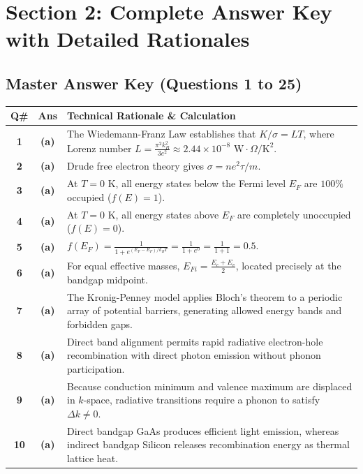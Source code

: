 \newpage
\section{Section 2: Complete Answer Key with Detailed Rationales}

\subsection*{Master Answer Key (Questions 1 to 25)}

{\small
\noindent\begin{tabularx}{\textwidth}{|c|c|X|}
\hline
\textbf{Q\#} & \textbf{Ans} & \textbf{Technical Rationale \& Calculation} \\
\hline
\textbf{1} & \textbf{(a)} & The Wiedemann-Franz Law establishes that $K/\sigma = L T$, where Lorenz number $L = \frac{\pi^2 k_B^2}{3e^2} \approx 2.44 \times 10^{-8}\text{ W}\cdot\Omega/\text{K}^2$. \\ \hline
\textbf{2} & \textbf{(a)} & Drude free electron theory gives $\sigma = n e^2\tau / m$. \\ \hline
\textbf{3} & \textbf{(a)} & At $T = 0\text{ K}$, all energy states below the Fermi level $E_F$ are $100\%$ occupied ($f(E) = 1$). \\ \hline
\textbf{4} & \textbf{(a)} & At $T = 0\text{ K}$, all energy states above $E_F$ are completely unoccupied ($f(E) = 0$). \\ \hline
\textbf{5} & \textbf{(a)} & $f(E_F) = \frac{1}{1 + e^{(E_F - E_F)/k_BT}} = \frac{1}{1 + e^0} = \frac{1}{1 + 1} = 0.5$. \\ \hline
\textbf{6} & \textbf{(a)} & For equal effective masses, $E_{Fi} = \frac{E_c + E_v}{2}$, located precisely at the bandgap midpoint. \\ \hline
\textbf{7} & \textbf{(a)} & The Kronig-Penney model applies Bloch's theorem to a periodic array of potential barriers, generating allowed energy bands and forbidden gaps. \\ \hline
\textbf{8} & \textbf{(a)} & Direct band alignment permits rapid radiative electron-hole recombination with direct photon emission without phonon participation. \\ \hline
\textbf{9} & \textbf{(a)} & Because conduction minimum and valence maximum are displaced in $k$-space, radiative transitions require a phonon to satisfy $\Delta k \ne 0$. \\ \hline
\textbf{10} & \textbf{(a)} & Direct bandgap GaAs produces efficient light emission, whereas indirect bandgap Silicon releases recombination energy as thermal lattice heat. \\ \hline

\end{tabularx}}
